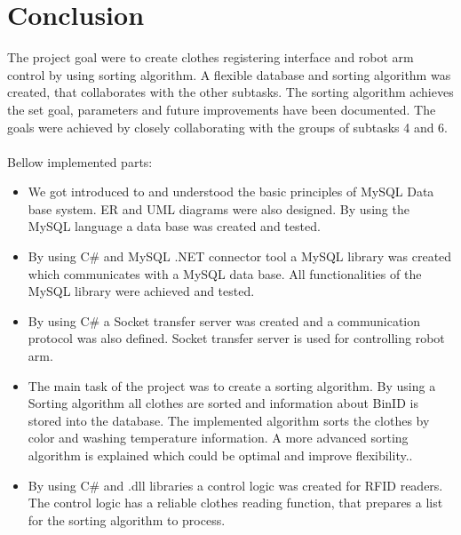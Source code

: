 \section{Conclusion}


The project goal were to create clothes registering interface and robot arm control by using sorting algorithm. A flexible database and sorting algorithm was created, that collaborates with the other subtasks. The sorting algorithm achieves the set goal, parameters and future improvements have been documented. The goals were achieved by closely collaborating with the groups of subtasks 4 and 6. 
\\ \\
Bellow implemented parts:
\\
\begin{itemize}
	\item We got introduced to and understood the basic principles of MySQL Data base system. ER and UML diagrams were also designed. By using the MySQL language a data base was created and tested.

	\item By using C\# and MySQL .NET connector tool a MySQL library was created which communicates with a MySQL data base. All functionalities of the MySQL library were achieved and tested.

	\item By using C\# a Socket transfer server was created and a communication protocol was also defined. Socket transfer server is used for controlling robot arm.

	\item The main task of the project was to create a sorting algorithm. By using a Sorting algorithm all clothes are sorted and information about BinID is stored into the
database. The implemented algorithm sorts the clothes by color and washing temperature information. A more advanced sorting algorithm is explained which could be optimal and improve flexibility..

	\item By using C\# and .dll libraries a control logic was created for RFID readers. The control logic has a reliable clothes reading function, that prepares a list for the sorting algorithm to process.
\end{itemize}

